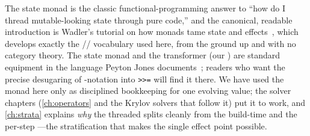 \furtherreading
The state monad is the classic functional-programming answer to ``how do I thread
mutable-looking state through pure code,'' and the canonical, readable introduction is
Wadler's tutorial on how monads tame state and effects~\citep{wadler1995monads}, which
develops exactly the // vocabulary used here, from the
ground up and with no category theory. The state monad and the 
transformer (our ) are standard equipment in the
language Peyton Jones documents~\citep{peytonjones2003}; readers who want the precise
desugaring of -notation into \texttt{>>=} will find it there. We have used the
monad here only as disciplined bookkeeping for one evolving value; the solver chapters
(\cref{ch:operators} and the Krylov solvers that follow it) put it to work, and
\cref{ch:strata} explains \emph{why} the threaded  splits cleanly from
the build-time  and the per-step ---the stratification
that makes the single effect point possible.

